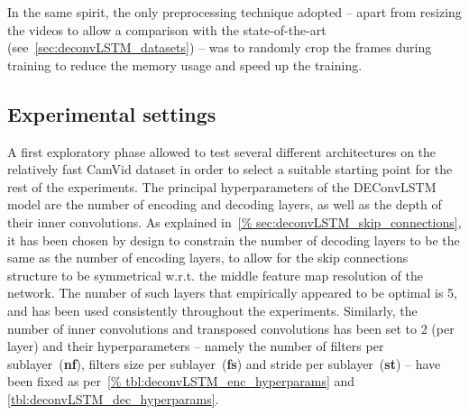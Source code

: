 In the same spirit, the only preprocessing technique adopted -- apart from
resizing the videos to allow a comparison with the state-of-the-art
(see~\autoref{sec:deconvLSTM_datasets}) -- was to randomly crop the frames
during training to reduce the memory usage and speed up the training.

\subsection{Experimental settings}\label{sec:deconvLSTM_settings}

A first exploratory phase allowed to test several different architectures on
the relatively fast CamVid dataset in order to select a suitable starting point
for the rest of the experiments. The principal hyperparameters of the
DEConvLSTM model are the number of encoding and decoding layers, as well as the
depth of their inner convolutions. As explained in~\autoref{%
sec:deconvLSTM_skip_connections}, it has been chosen by design to constrain the
number of decoding layers to be the same as the number of encoding layers, to
allow for the skip connections structure to be symmetrical w.r.t. the middle
feature map resolution of the network. The number of such layers that
empirically appeared to be optimal is 5, and has been used consistently
throughout the experiments.
Similarly, the number of inner convolutions and transposed convolutions has
been set to 2 (per layer) and their hyperparameters -- namely the number of
filters per sublayer~(\textbf{nf}), filters size per sublayer~(\textbf{fs}) and
stride per sublayer~(\textbf{st}) -- have been fixed as per~\autoref{%
tbl:deconvLSTM_enc_hyperparams} and \autoref{tbl:deconvLSTM_dec_hyperparams}.

